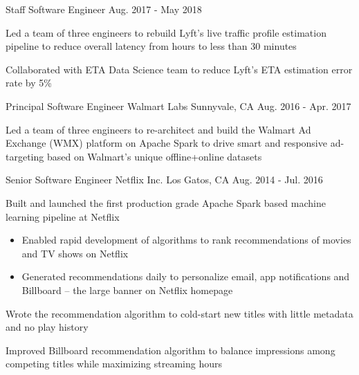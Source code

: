 \begin{cventries}
  \cventry
    {Staff Software Engineer} %
    {} %
    {} %
    {Aug. 2017 - May 2018} %
    {
      \begin{cvitems} %
        \item{Led a team of three engineers to rebuild Lyft's live traffic profile estimation pipeline to reduce overall latency from hours to less than 30 minutes}
        \item{Collaborated with ETA Data Science team to reduce Lyft's ETA estimation error rate by 5\%}
      \end{cvitems}
    }

  \cventry
    {Principal Software Engineer} %
    {Walmart Labs} %
    {Sunnyvale, CA} %
    {Aug. 2016 - Apr. 2017} %
    {
      \begin{cvitems} %
        \item{Led a team of three engineers to re-architect and build the Walmart Ad Exchange (WMX) platform on Apache Spark to drive smart and responsive ad-targeting based on Walmart’s unique offline+online datasets}
      \end{cvitems}
    }

  \cventry
    {Senior Software Engineer} %
    {Netflix Inc.} %
    {Los Gatos, CA} %
    {Aug. 2014 - Jul. 2016} %
    {
      \begin{cvitems} %
        \item{Built and launched the first production grade Apache Spark based machine learning pipeline at Netflix}
          \begin{itemize}[label=$\circ$]
            \item{Enabled rapid development of algorithms to rank recommendations of movies and TV shows on Netflix}
            \item{Generated recommendations daily to personalize email, app notifications and Billboard – the large banner on Netflix homepage}
          \end{itemize}
        \item{Wrote the recommendation algorithm to cold-start new titles with little metadata and no play history}
        \item{Improved Billboard recommendation algorithm to balance impressions among competing titles while maximizing streaming hours}
      \end{cvitems}
    }


\end{cventries}

